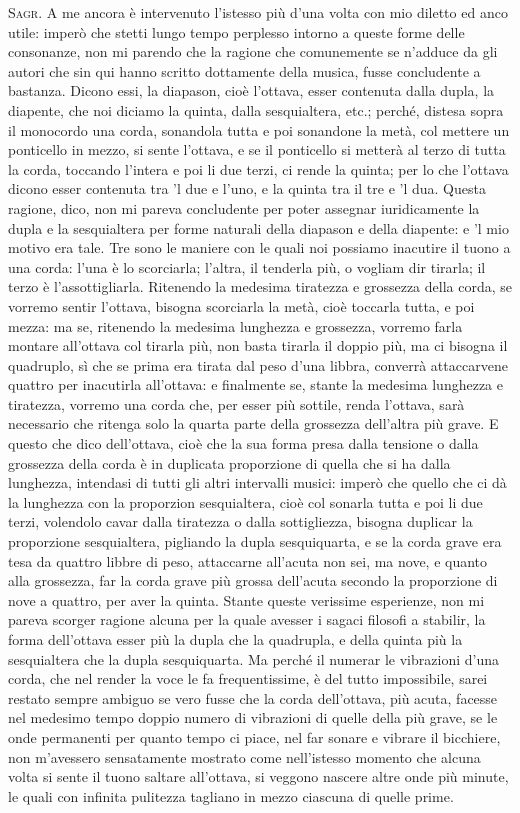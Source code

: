 \documentclass[11pt,twoside,openany]{book}
\newcommand{\speaker}[1]{\textcolor{rubric}{\textsc{#1}}\space}
\begin{document}
\speaker{Sagr.} A me ancora è intervenuto l'istesso più d'una volta con mio diletto ed anco utile: imperò che stetti lungo tempo perplesso intorno a queste forme delle consonanze, non mi parendo che la ragione che comunemente se n'adduce da gli autori che sin qui hanno scritto dottamente della musica, fusse concludente a bastanza. Dicono essi, la diapason, cioè l'ottava, esser contenuta dalla dupla, la diapente, che noi diciamo la quinta, dalla sesquialtera, etc.; perché, distesa sopra il monocordo una corda, sonandola tutta e poi sonandone la metà, col mettere un ponticello in mezzo, si sente l'ottava, e se il ponticello si metterà al terzo di tutta la corda, toccando l'intera e poi li due terzi, ci rende la quinta; per lo che l'ottava dicono esser contenuta tra 'l due e l'uno, e la quinta tra il tre e 'l dua. Questa ragione, dico, non mi pareva concludente per poter assegnar iuridicamente la dupla e la sesquialtera per forme naturali della diapason e della diapente: e 'l mio motivo era tale. Tre sono le maniere con le quali noi possiamo inacutire il tuono a una corda: l'una è lo scorciarla; l'altra, il tenderla più, o vogliam dir tirarla; il terzo è l'assottigliarla. Ritenendo la medesima tiratezza e grossezza della corda, se vorremo sentir l'ottava, bisogna scorciarla la metà, cioè toccarla tutta, e poi mezza: ma se, ritenendo la medesima lunghezza e grossezza, vorremo farla montare all'ottava col tirarla più, non basta tirarla il doppio più, ma ci bisogna il quadruplo, sì che se prima era tirata dal peso d'una libbra, converrà attaccarvene quattro per inacutirla all'ottava: e finalmente se, stante la medesima lunghezza e tiratezza, vorremo una corda che, per esser più sottile, renda l'ottava, sarà necessario che ritenga solo la quarta parte della grossezza dell'altra più grave. E questo che dico dell'ottava, cioè che la sua forma presa dalla tensione o dalla grossezza della corda è in duplicata proporzione di quella che si ha dalla lunghezza, intendasi di tutti gli altri intervalli musici: imperò che quello che ci dà la lunghezza con la proporzion sesquialtera, cioè col sonarla tutta e poi li due terzi, volendolo cavar dalla tiratezza o dalla sottigliezza, bisogna duplicar la proporzione sesquialtera, pigliando la dupla sesquiquarta, e se la corda grave era tesa da quattro libbre di peso, attaccarne all'acuta non sei, ma nove, e quanto alla grossezza, far la corda grave più grossa dell'acuta secondo la proporzione di nove a quattro, per aver la quinta. Stante queste verissime esperienze, non mi pareva scorger ragione alcuna per la quale avesser i sagaci filosofi a stabilir, la forma dell'ottava esser più la dupla che la quadrupla, e della quinta più la sesquialtera che la dupla sesquiquarta. Ma perché il numerar le vibrazioni d'una corda, che nel render la voce le fa frequentissime, è del tutto impossibile, sarei restato sempre ambiguo se vero fusse che la corda dell'ottava, più acuta, facesse nel medesimo tempo doppio numero di vibrazioni di quelle della più grave, se le onde permanenti per quanto tempo ci piace, nel far sonare e vibrare il bicchiere, non m'avessero sensatamente mostrato come nell'istesso momento che alcuna volta si sente il tuono saltare all'ottava, si veggono nascere altre onde più minute, le quali con infinita pulitezza tagliano in mezzo ciascuna di quelle prime.
\end{document}
